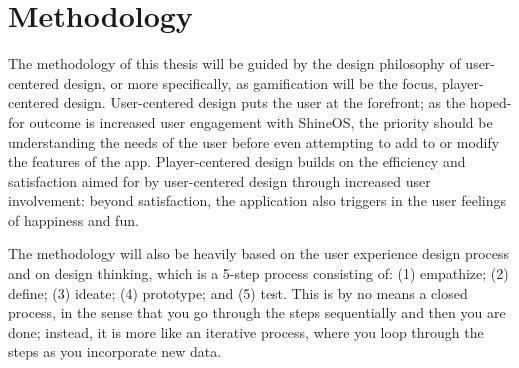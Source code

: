 \chapter{Methodology}

The methodology of this thesis will be guided by the design philosophy of user-centered design, or more specifically, as gamification will be the focus, player-centered design. User-centered design puts the user at the forefront; as the hoped-for outcome is increased user engagement with ShineOS, the priority should be understanding the needs of the user before even attempting to add to or modify the features of the app. Player-centered design builds on the efficiency and satisfaction aimed for by user-centered design through increased user involvement: beyond satisfaction, the application also triggers in the user feelings of happiness and fun.

The methodology will also be heavily based on the user experience design process and on design thinking, which is a 5-step process consisting of: (1) empathize; (2) define; (3) ideate; (4) prototype; and (5) test. This is by no means a closed process, in the sense that you go through the steps sequentially and then you are done; instead, it is more like an iterative process, where you loop through the steps as you incorporate new data.
